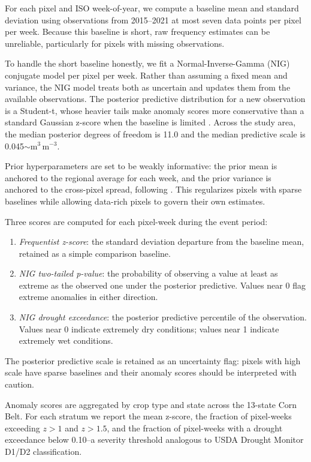 \documentclass{article}
\begin{document}
For each pixel and ISO week-of-year, we compute a baseline mean and standard deviation using observations from 2015--2021 at most seven data points per pixel per week. Because this baseline is short, raw frequency estimates can be unreliable, particularly for pixels with missing observations.

To handle the short baseline honestly, we fit a Normal-Inverse-Gamma (NIG) conjugate model per pixel per week. Rather than assuming a fixed mean and variance, the NIG model treats both as uncertain and updates them from the available observations. The posterior predictive distribution for a new observation is a Student-t, whose heavier tails make anomaly scores more conservative than a standard Gaussian z-score when the baseline is limited \cite{xu2018ssi}. Across the study area, the median posterior degrees of freedom is 11.0 and the median predictive scale is 0.045$\sim$m$^3$\,m$^{-3}$.

Prior hyperparameters are set to be weakly informative: the prior mean is anchored to the regional average for each week, and the prior variance is anchored to the cross-pixel spread, following \cite{gelman2008weakly}. This regularizes pixels with sparse baselines while allowing data-rich pixels to govern their own estimates.

Three scores are computed for each pixel-week during the event period:
\begin{enumerate}
    \item \textit{Frequentist z-score}: the standard deviation departure from the baseline mean, retained as a simple comparison baseline.
    \item \textit{NIG two-tailed p-value}: the probability of observing a value at least as extreme as the observed one under the posterior predictive. Values near 0 flag extreme anomalies in either direction.
    \item \textit{NIG drought exceedance}: the posterior predictive percentile of the observation. Values near 0 indicate extremely dry conditions; values near 1 indicate extremely wet conditions.
\end{enumerate}

The posterior predictive scale is retained as an uncertainty flag: pixels with high scale have sparse baselines and their anomaly scores should be interpreted with caution.

Anomaly scores are aggregated by crop type and state across the 13-state Corn Belt. For each stratum we report the mean z-score, the fraction of pixel-weeks exceeding $z > 1$ and $z > 1.5$, and the 
fraction of pixel-weeks with a drought exceedance below 0.10--a severity threshold analogous to USDA Drought Monitor D1/D2 classification.
\end{document}

